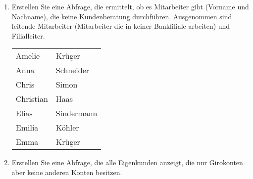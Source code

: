 \begin{enumerate}
\begin{center}
\begin{small}
\begin{msoraclesql}
\begin{supertabular}{llll}
              \end{supertabular}
            \end{msoraclesql}
          \end{small}
        \end{center}
        \item Erstellen Sie eine Abfrage, die ermittelt, ob es Mitarbeiter gibt
        (Vorname und Nachname), die keine Kundenberatung durchführen.
        Ausgenommen sind leitende Mitarbeiter (Mitarbeiter die in keiner
        Bankfiliale arbeiten) und Filialleiter.
        \begin{center}
          \begin{small}
            \tablehead{}
            \begin{msoraclesql}
              \begin{supertabular}{ll}
                Amelie & Krüger \\
                Anna & Schneider \\
                Chris & Simon \\
                Christian & Haas \\
                Elias & Sindermann \\
                Emilia & Köhler \\
                Emma & Krüger \\
              \end{supertabular}
            \end{msoraclesql}
          \end{small}
        \end{center}
        \item Erstellen Sie eine Abfrage, die alle Eigenkunden anzeigt, die nur
        Girokonten aber keine anderen Konten besitzen.
        \begin{center}
          \begin{small}
            \tablefirsthead {
}
\end{small}
\end{center}
\end{enumerate}
